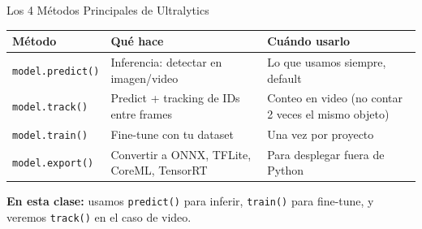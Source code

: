 
\begin{frame}[shrink]{Los 4 M\'etodos Principales de Ultralytics}
  \vspace{8pt}
  {\footnotesize
  \begin{tabular}{@{}p{2.5cm} p{4.5cm} p{5.5cm}@{}}
    \toprule
    \textbf{M\'etodo} & \textbf{Qu\'e hace} & \textbf{Cu\'ando usarlo} \\
    \midrule
    \rowcolor{arcaGray}
    \texttt{model.predict()}
    & Inferencia: detectar en imagen/video
    & Lo que usamos siempre, default \\
    \texttt{model.track()}
    & Predict + tracking de IDs entre frames
    & Conteo en video (no contar 2 veces el mismo objeto) \\
    \rowcolor{arcaGray}
    \texttt{model.train()}
    & Fine-tune con tu dataset
    & Una vez por proyecto \\
    \texttt{model.export()}
    & Convertir a ONNX, TFLite, CoreML, TensorRT
    & Para desplegar fuera de Python \\
    \bottomrule
  \end{tabular}
  }

  \vspace{12pt}
  \begin{tcolorbox}[colback=codeGreen!8, colframe=codeGreen, boxrule=0.5pt,
    arc=2pt, left=6pt, right=6pt, top=4pt, bottom=4pt]
    {\scriptsize\color{arcaDark}
    \faKey\hspace{4pt}\textbf{En esta clase:} usamos \texttt{predict()} para
    inferir, \texttt{train()} para fine-tune, y veremos \texttt{track()} en
    el caso de video.}
  \end{tcolorbox}
\end{frame}

